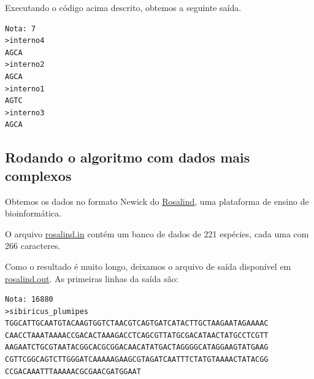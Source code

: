 \documentclass[11pt]{article}
\begin{document}
Executando o código acima descrito, obtemos a seguinte saída.

\begin{verbatim}
Nota: 7
>interno4
AGCA
>interno2
AGCA
>interno1
AGTC
>interno3
AGCA
\end{verbatim}

\subsection{Rodando o algoritmo com dados mais complexos}
\label{sec-3-6}

Obtemos os dados no formato Newick do \href{http://rosalind.info}{Rosalind}, uma plataforma de
ensino de bioinformática.

O arquivo \href{https://github.com/adusca/FGV-EDA/blob/master/6_30/rosalind.in}{rosalind.in} contém um banco de dados de 221 espécies, cada
uma com 266 caracteres.

Como o resultado é muito longo, deixamos o arquivo de saída disponível
em \href{https://github.com/adusca/FGV-EDA/blob/master/6_30/rosalind.out}{rosalind.out}. As primeiras linhas da saída são:

\begin{verbatim}
Nota: 16880
>sibiricus_plumipes
TGGCATTGCAATGTACAAGTGGTCTAACGTCAGTGATCATACTTGCTAAGAATAGAAAAC
CAACCTAAATAAAACCGACACTAAAGACCTCAGCGTTATGCGACATAACTATGCCTCGTT
AAGAATCTGCGTAATACGGCACGCGGACAACATATGACTAGGGGCATAGGAAGTATGAAG
CGTTCGGCAGTCTTGGGATCAAAAAGAAGCGTAGATCAATTTCTATGTAAAACTATACGG
CCGACAAATTTAAAAACGCGAACGATGGAAT
\end{verbatim}
\end{document}
